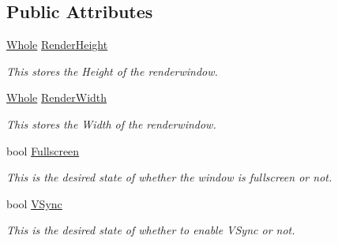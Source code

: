 \subsection*{Public Attributes}
\begin{DoxyCompactItemize}
\item 
\hypertarget{structphys_1_1GraphicsSettings_a82fe053e6276e29fbf473c3854bd4265}{
\hyperlink{namespacephys_a460f6bc24c8dd347b05e0366ae34f34a}{Whole} \hyperlink{structphys_1_1GraphicsSettings_a82fe053e6276e29fbf473c3854bd4265}{RenderHeight}}
\label{d0/dd0/structphys_1_1GraphicsSettings_a82fe053e6276e29fbf473c3854bd4265}

\begin{DoxyCompactList}\small\item\em This stores the Height of the renderwindow. \item\end{DoxyCompactList}\item 
\hypertarget{structphys_1_1GraphicsSettings_a34226592a7e1ce7b0a2036afed00f239}{
\hyperlink{namespacephys_a460f6bc24c8dd347b05e0366ae34f34a}{Whole} \hyperlink{structphys_1_1GraphicsSettings_a34226592a7e1ce7b0a2036afed00f239}{RenderWidth}}
\label{d0/dd0/structphys_1_1GraphicsSettings_a34226592a7e1ce7b0a2036afed00f239}

\begin{DoxyCompactList}\small\item\em This stores the Width of the renderwindow. \item\end{DoxyCompactList}\item 
\hypertarget{structphys_1_1GraphicsSettings_a64e9751b921685cac320650bd54e0a8e}{
bool \hyperlink{structphys_1_1GraphicsSettings_a64e9751b921685cac320650bd54e0a8e}{Fullscreen}}
\label{d0/dd0/structphys_1_1GraphicsSettings_a64e9751b921685cac320650bd54e0a8e}

\begin{DoxyCompactList}\small\item\em This is the desired state of whether the window is fullscreen or not. \item\end{DoxyCompactList}\item 
\hypertarget{structphys_1_1GraphicsSettings_ade8df051b7da492f0b48014edfca532a}{
bool \hyperlink{structphys_1_1GraphicsSettings_ade8df051b7da492f0b48014edfca532a}{VSync}}
\label{d0/dd0/structphys_1_1GraphicsSettings_ade8df051b7da492f0b48014edfca532a}

\begin{DoxyCompactList}\small\item\em This is the desired state of whether to enable VSync or not. \item\end{DoxyCompactList}\end{DoxyCompactItemize}


